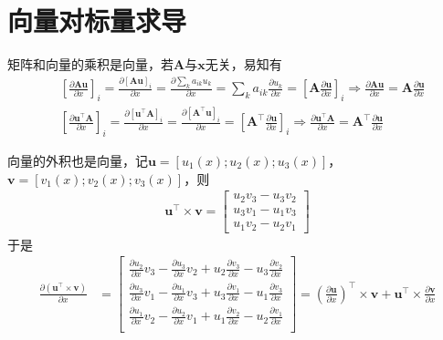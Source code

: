 \documentclass{ctexart}
\theoremstyle{definition}
\def \uv {\bm{u}}
\def \vv {\bm{v}}
\def \xv {\bm{x}}
\def \Av {\mathbf{A}}
\begin{document}
\section{向量对标量求导}

矩阵和向量的乘积是向量，若$\Av$与$\xv$无关，易知有
\begin{align*}
     & \left[ \frac{\partial \Av \uv}{\partial x} \right]_{i} = \frac{\partial [\Av \uv]_i}{\partial x} = \frac{\partial \sum_k a_{ik} u_k}{\partial x} = \sum_k a_{ik} \frac{\partial u_k}{\partial x} = \left[ \Av \frac{\partial \uv}{\partial x} \right]_i \Longrightarrow \frac{\partial \Av \uv}{\partial x} = \Av \frac{\partial \uv}{\partial x} \\
     & \left[ \frac{\partial \uv^\top \Av}{\partial x} \right]_i = \frac{\partial [\uv^\top \Av]_i}{\partial x} = \frac{\partial [\Av^\top \uv]_i}{\partial x} = \left[ \Av^\top \frac{\partial \uv}{\partial x} \right]_i \Longrightarrow \frac{\partial \uv^\top \Av}{\partial x} = \Av^\top \frac{\partial \uv}{\partial x}
\end{align*}

向量的外积也是向量，记$\uv = [u_1(x); u_2(x); u_3(x)]$，$\vv = [v_1(x); v_2(x); v_3(x)]$，则
\begin{align*}
    \uv^\top \times \vv = \begin{bmatrix}
        u_2 v_3 - u_3 v_2 \\ u_3 v_1 - u_1 v_3 \\ u_1 v_2 - u_2 v_1
    \end{bmatrix}
\end{align*}
于是
\begin{align*}
    \frac{\partial (\uv^\top \times \vv)}{\partial x} & = \begin{bmatrix}
        \frac{\partial u_2}{\partial x} v_3 - \frac{\partial u_3}{\partial x} v_2 + u_2 \frac{\partial v_3}{\partial x} - u_3 \frac{\partial v_2}{\partial x} \\
        \frac{\partial u_3}{\partial x} v_1 - \frac{\partial u_1}{\partial x} v_3 + u_3 \frac{\partial v_1}{\partial x} - u_1 \frac{\partial v_3}{\partial x} \\
        \frac{\partial u_1}{\partial x} v_2 - \frac{\partial u_2}{\partial x} v_1 + u_1 \frac{\partial v_2}{\partial x} - u_2 \frac{\partial v_1}{\partial x} \\
    \end{bmatrix} = \left( \frac{\partial \uv}{\partial x} \right)^\top \times \vv + \uv^\top \times \frac{\partial \vv}{\partial x}
\end{align*}
\end{document}
